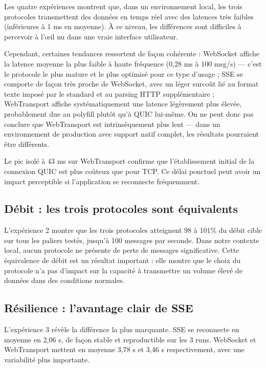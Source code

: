 Les quatre expériences montrent que, dans un environnement local, les trois protocoles transmettent des données en temps réel avec des latences très faibles (inférieures à 1 ms en moyenne). À ce niveau, les différences sont difficiles à percevoir à l'œil nu dans une vraie interface utilisateur.

Cependant, certaines tendances ressortent de façon cohérente : WebSocket affiche la latence moyenne la plus faible à haute fréquence (0,28 ms à 100 msg/s) --- c'est le protocole le plus mature et le plus optimisé pour ce type d'usage ; SSE se comporte de façon très proche de WebSocket, avec un léger surcoût lié au format texte imposé par le standard et au parsing HTTP supplémentaire ; WebTransport affiche systématiquement une latence légèrement plus élevée, probablement due au polyfill plutôt qu'à QUIC lui-même. On ne peut donc pas conclure que WebTransport est intrinsèquement plus lent --- dans un environnement de production avec support natif complet, les résultats pourraient être différents.

Le pic isolé à 43 ms sur WebTransport confirme que l'établissement initial de la connexion QUIC est plus coûteux que pour TCP. Ce délai ponctuel peut avoir un impact perceptible si l'application se reconnecte fréquemment.

\subsection{Débit : les trois protocoles sont équivalents}

L'expérience 2 montre que les trois protocoles atteignent 98 à 101\% du débit cible sur tous les paliers testés, jusqu'à 100 messages par seconde. Dans notre contexte local, aucun protocole ne présente de perte de messages significative. Cette équivalence de débit est un résultat important : elle montre que le choix du protocole n'a pas d'impact sur la capacité à transmettre un volume élevé de données dans des conditions normales.

\subsection{Résilience : l'avantage clair de SSE}

L'expérience 3 révèle la différence la plus marquante. SSE se reconnecte en moyenne en 2,06 s, de façon stable et reproductible sur les 3 runs. WebSocket et WebTransport mettent en moyenne 3,78 s et 3,46 s respectivement, avec une variabilité plus importante.

